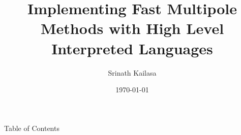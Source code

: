 \documentclass{beamer}
\title{Implementing Fast Multipole Methods with High Level Interpreted Languages}
\author{Srinath Kailasa}
\institute{Department of Physics \& Astronomy\\University College London}
\date{\today}
\begin{document}
\frame{\titlepage}

\begin{frame}{Table of Contents}
\tableofcontents[hideallsubsections]
\end{frame}






\end{document}
